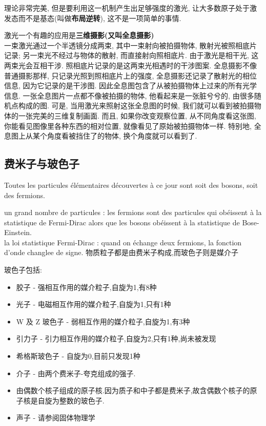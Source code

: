理论非常完美, 但是要利用这一机制产生出足够强度的激光, 让大多数原子处于激发态而不是基态(叫做\textbf{布局逆转}), 这不是一项简单的事情.

激光一个有趣的应用是\textbf{三维摄影(又叫全息摄影)}\\
一束激光通过一个半透镜分成两束, 其中一束射向被拍摄物体, 散射光被照相底片记录; 另一束光不经过与物体的散射, 而直接射向照相底片. 由于激光是相干光, 这两束光会互相干涉.
照相底片记录的是这两束光相遇时的干涉图案. 全息摄影不像普通摄影那样, 只记录光照到照相底片上的强度, 全息摄影还记录了散射光的相位信息, 因为它记录的是干涉图.
因此全息图包含了从被拍摄物体上过来的所有光学信息. 一张全息图片一点都不像被拍摄的物体, 他看起来是一张脏兮兮的, 由很多随机点构成的图.
可是, 当用激光来照射这张全息图的时候, 我们就可以看到被拍摄物体的一张完美的三维复制画面.
而且, 如果你改变观察位置, 从不同角度看这张图, 你能看见图像里各种东西的相对位置, 就像看见了原始被拍摄物体一样.
特别地, 全息图上从某个角度看被挡住了的物体, 换个角度就可以看到了.

\subsection{费米子与玻色子}
Toutes les particules \'el\'ementaires d\'ecouvertes \`a ce jour sont soit des bosons, soit des fermions.\par

un grand nombre de particules : les fermions sont des particules qui ob\'eissent \`a la statistique de Fermi-Dirac alors que les bosons ob\'eissent \`a la statistique de Bose-Einstein.\\
la loi statistique Fermi-Dirac : quand on \'echange deux fermions, la fonction d'onde changlee de signe.
物质粒子都是由费米子构成,而玻色子则是媒介子

玻色子包括:
\begin{itemize}
\item 胶子 - 强相互作用的媒介粒子,自旋为1,有8种
\item 光子 - 电磁相互作用的媒介粒子,自旋为1,只有1种
\item W 及 Z 玻色子 - 弱相互作用的媒介粒子,自旋为1,有3种
\item 引力子 - 引力相互作用的媒介粒子,自旋为2,只有1种,尚未被发现
\item 希格斯玻色子 - 自旋为0,目前只发现1种
\item 介子 - 由两个费米子-夸克组成的强子.
\item 由偶数个核子组成的原子核.因为质子和中子都是费米子,故含偶数个核子的原子核是自旋为整数的玻色子.
\item 声子 - 请参阅固体物理学
\end{itemize}

